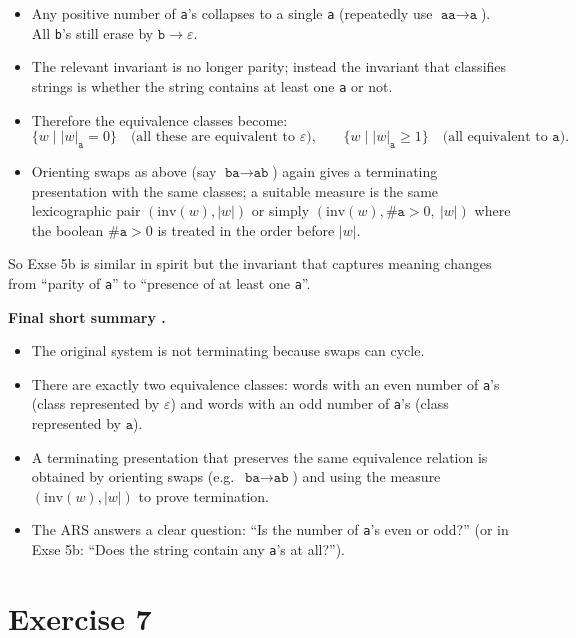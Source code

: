 \documentclass{article}
\theoremstyle{plain}
\theoremstyle{definition}
\theoremstyle{remark}
\begin{document}
\begin{itemize}
  \item Any positive number of \texttt{a}'s collapses to a single \texttt{a} (repeatedly use \(\texttt{aa}\to\texttt{a}\)). All \texttt{b}'s still erase by \(\texttt{b}\to\varepsilon\).
  \item The relevant invariant is no longer parity; instead the invariant that classifies strings is whether the string contains at least one \texttt{a} or not.
  \item Therefore the equivalence classes become:
    \[
      \{w\mid |w|_{\texttt{a}}=0\}\quad\text{(all these are equivalent to }\varepsilon\text{),}
      \qquad
      \{w\mid |w|_{\texttt{a}}\ge 1\}\quad\text{(all equivalent to }\texttt{a}\text{).}
    \]
  \item Orienting swaps as above (say \(\texttt{ba}\to\texttt{ab}\)) again gives a terminating presentation with the same classes; a suitable measure is the same lexicographic pair \((\mathrm{inv}(w),|w|)\) or simply \((\mathrm{inv}(w),\#\texttt{a}>0,\ |w|)\) where the boolean \(\#\texttt{a}>0\) is treated in the order before \(|w|\).
\end{itemize}

So Exse 5b is similar in spirit but the invariant that captures meaning changes from ``parity of \texttt{a}'' to ``presence of at least one \texttt{a}''.

\bigskip

\textbf{Final short summary .}
\begin{itemize}
  \item The original system is not terminating because swaps can cycle.
  \item There are exactly two equivalence classes: words with an even number of \texttt{a}'s (class represented by \(\varepsilon\)) and words with an odd number of \texttt{a}'s (class represented by \(\texttt{a}\)).
  \item A terminating presentation that preserves the same equivalence relation is obtained by orienting swaps (e.g.\ \(\texttt{ba}\to\texttt{ab}\)) and using the measure \((\mathrm{inv}(w),|w|)\) to prove termination.
  \item The ARS answers a clear question: ``Is the number of \texttt{a}'s even or odd?'' (or in Exse 5b: ``Does the string contain any \texttt{a}'s at all?'').
\end{itemize}

\section{Exercise 7}
\end{document}

